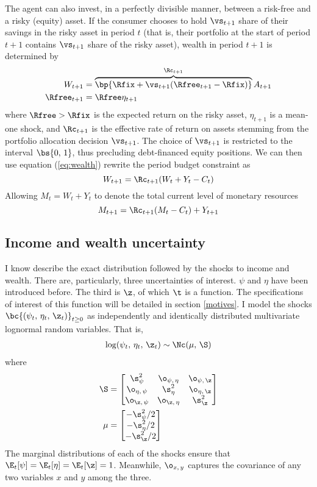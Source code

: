 The agent can also invest, in a perfectly divisible manner, between a risk-free and a risky (equity) asset. If the consumer chooses to hold $\vs_{t+1}$ share of their savings in the risky asset in period $t$ (that is, their portfolio at the start of period $t+1$ contains $\vs_{t+1}$ share of the risky asset), wealth in period $t+1$ is determined by
\begin{align}
    W_{t+1} &= \overbrace{\bp{\Rfix + \vs_{t+1}(\Rfree_{t+1} - \Rfix)}}^{\Rc_{t+1}}A_{t+1} \label{eq:wealth}\\
    \Rfree_{t+1} &= \Rfree \eta_{t+1} \label{eq:return}
\end{align}
where $\Rfree > \Rfix$ is the expected return on the risky asset, $\eta_{t+1}$ is a mean-one shock, and $\Rc_{t+1}$ is the effective rate of return on assets stemming from the portfolio allocation decision $\vs_{t+1}$. The choice of $\vs_{t+1}$ is restricted to the interval $\bs{0,\,1}$, thus precluding debt-financed equity positions. We can then use equation (\ref{eq:wealth}) rewrite the period budget constraint as
\[
W_{t+1} = \Rc_{t+1}(W_{t} + Y_{t} - C_{t})
\]
Allowing $M_t = W_t + Y_t$ to denote the total current level of monetary resources
\[
M_{t+1} = \Rc_{t+1}(M_t - C_t) + Y_{t+1}
\]

\subsection{Income and wealth uncertainty}

I know describe the exact distribution followed by the shocks to income and wealth. There are, particularly, three uncertainties of interest. $\psi$ and $\eta$ have been introduced before. The third is $\z$, of which $\t$ is a function. The specifications  of interest of this function will be detailed in section \ref{motives}. I model the shocks $\bc{(\psi_t,\,\eta_t,\,\z_t)}_{t \geq 0}$ as independently and identically distributed multivariate lognormal random variables. That is,
\begin{align*}
    \log (\psi_t,\,\eta_t,\,\z_t) \sim \Nc(\mu,\,\S)
\end{align*}
where
\begin{align*}
    \S &= \begin{bmatrix}
        \s_{\psi}^2 & \o_{\psi,\,\eta} & \o_{\psi,\,\z}\\
        \o_{\eta,\,\psi} & \s_{\eta}^2 & \o_{\eta,\,\z}\\
        \o_{\z,\,\psi} & \o_{\z,\,\eta} & \s_{\z}^2
    \end{bmatrix}\\
    \mu &= \begin{bmatrix}
        -\s_{\psi}^2 / 2\\
        -\s_{\eta}^2 / 2\\
        -\s_{\z}^2 / 2
    \end{bmatrix}
\end{align*}
The marginal distributions of each of the shocks ensure that $\E_t[\psi] = \E_t[\eta] = \E_t[\z] = 1$. Meanwhile, $\o_{x,\,y}$ captures the covariance of any two variables $x$ and $y$ among the three.

